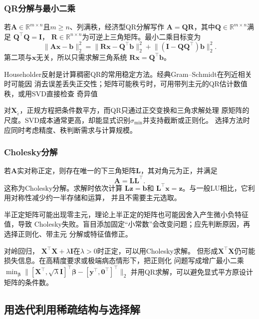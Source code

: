 \subsubsection{QR分解与最小二乘}

若$\bm{A}\in\mathbb{R}^{m\times n}$且$m\geq n$、列满秩，经济型QR分解写作
$\bm{A}=\bm{Q}\bm{R}$，其中$\bm{Q}\in\mathbb{R}^{m\times n}$满足
$\bm{Q}^{\top}\bm{Q}=\bm{I}$，
$\bm{R}\in\mathbb{R}^{n\times n}$为可逆上三角矩阵。最小二乘目标变为
\[
  \lVert\bm{A}\bm{x}-\bm{b}\rVert_2^2
  =\lVert\bm{R}\bm{x}-\bm{Q}^{\top}\bm{b}\rVert_2^2+
  \lVert(\bm{I}-\bm{Q}\bm{Q}^{\top})\bm{b}\rVert_2^2.
\]
第二项与$\bm{x}$无关，所以只需求解三角系统
$\bm{R}\bm{x}=\bm{Q}^{\top}\bm{b}$。

Householder反射是计算稠密QR的常用稳定方法。经典Gram--Schmidt在列近相关时可能因
消去误差丢失正交性；矩阵可能秩亏时，可用带列主元的QR估计数值秩，或用SVD直接检查
奇异值

对$\bm{X}_{\widetilde{\varepsilon}}$，正规方程把条件数平方，而QR只通过正交变换和三角求解处理
原矩阵的尺度。SVD成本通常更高，却能显式识别$\sigma_{\min}$并支持截断或正则化。
选择方法时应同时考虑精度、秩判断需求与计算规模。

\subsubsection{Cholesky分解}

若$\bm{A}$实对称正定，则存在唯一的下三角矩阵$\bm{L}$，其对角元为正，并满足
\begin{equation}
  \bm{A}=\bm{L}\bm{L}^{\top}.
  \label{eq:matrix-analysis-cholesky}
\end{equation}
这称为Cholesky分解。求解时依次计算
$\bm{L}\bm{z}=\bm{b}$和
$\bm{L}^{\top}\bm{x}=\bm{z}$。与一般LU相比，它利用对称性减少约一半存储和运算，
并且不需要主元选取。

半正定矩阵可能出现零主元，理论上半正定的矩阵也可能因舍入产生微小负特征值，导致
Cholesky失败。盲目添加固定“小常数”会改变问题；应先判断原因，再选择正则化、带主元
分解或特征值修正。

对岭回归，
$\bm{X}^{\top}\bm{X}+\lambda\bm{I}$在$\lambda>0$时正定，可以用Cholesky求解。
但形成$\bm{X}^{\top}\bm{X}$仍可能损失信息。在高精度要求或极端病态情形下，把正则化
问题写成增广最小二乘
$\min_{\bm{\beta}}\lVert
[\bm{X}^{\top},\sqrt{\lambda}\bm{I}]^{\top}\bm{\beta}
-[\bm{y}^{\top},\bm{0}^{\top}]^{\top}\rVert_2$
并用QR求解，可以避免显式平方原设计矩阵的条件数。

\subsection{用迭代利用稀疏结构与选择解}

